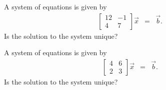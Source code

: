 

\begin{problem}
\item 

  \begin{subproblem}
  \item A system of equations is given by
    \begin{eqnarray}
      \left[
        \begin{array}{rr}
          12 & -1 \\
          4 & 7
        \end{array}
      \right] \vec{x} & = & \vec{b}.
    \end{eqnarray}
    Is the solution to the system unique?
    \vfill

  \item A system of equations is given by
    \begin{eqnarray}
      \left[
        \begin{array}{rr}
          4 & 6 \\
          2 & 3
        \end{array}
      \right] \vec{x} & = & \vec{b}.
    \end{eqnarray}
    Is the solution to the system unique?
    \vfill
      
  \end{subproblem}
\end{problem}


